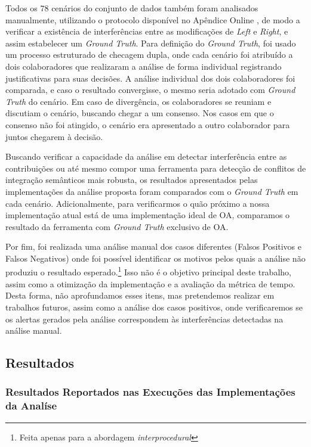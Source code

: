 Todos os 78 cenários do conjunto de dados também foram analisados manualmente, utilizando o protocolo disponível no Apêndice Online , de modo a verificar a existência de interferências entre as modificações de \emph{Left} e \emph{Right}, e assim estabelecer um \emph{Ground Truth}. Para definição do \emph{Ground Truth}, foi usado um processo estruturado de checagem dupla, onde cada cenário foi atribuído a dois colaboradores que realizaram a análise de forma individual registrando justificativas para suas decisões. A análise individual dos dois colaboradores foi comparada, e caso o resultado convergisse, o mesmo seria adotado com \emph{Ground Truth} do cenário. Em caso de divergência, os colaboradores se reuniam e discutiam o cenário, buscando chegar a um consenso. Nos casos em que o consenso não foi atingido, o cenário era apresentado a outro colaborador para juntos chegarem 
à decisão.

Buscando verificar a capacidade da análise em detectar interferência entre as contribuições ou até mesmo compor uma ferramenta para detecção de conflitos de integração semânticos mais robusta, os resultados apresentados pelas implementações da análise proposta foram comparados com o \emph{Ground Truth} em cada cenário. Adicionalmente, para verificarmos o quão próximo a nossa implementação atual está de uma implementação ideal de OA, comparamos o resultado da ferramenta com \emph{Ground Truth} exclusivo de OA. 

Por fim, foi realizada uma análise manual dos casos diferentes (Falsos Positivos e Falsos Negativos) onde foi possível identificar os motivos pelos quais a análise não produziu o resultado esperado.\footnote{Feita apenas para a abordagem \emph{interprocedural}} Isso não é o objetivo principal deste trabalho, assim como a otimização da implementação e a avaliação da métrica de tempo. Desta forma, não aprofundamos esses itens, mas pretendemos realizar em trabalhos futuros, assim como a análise dos casos positivos, onde verificaremos se os alertas gerados pela análise correspondem às interferências detectadas na análise manual.

\subsection{Resultados}

\subsubsection{Resultados Reportados nas Execuções das Implementações da Analíse}

